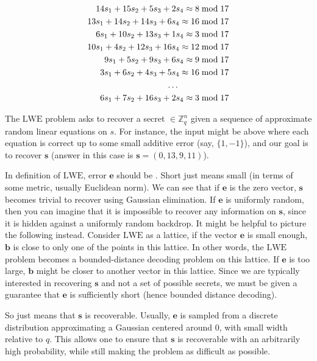 \begin{equation}
\centering
\begin{split}
14s_1 + 15s_2 + 5s_3 + 2s_4 \approx 8 \bmod 17\\
13s_1 + 14s_2 + 14s_3 + 6s_4 \approx 16 \bmod 17\\
6s_1 + 10s_2 + 13s_3 + 1s_4 \approx 3 \bmod 17\\
10s_1 + 4s_2 + 12s_3 + 16s_4 \approx 12 \bmod 17\\
9s_1 + 5s_2 + 9s_3 + 6s_4 \approx 9 \bmod 17\\
3s_1 + 6s_2 + 4s_3 + 5s_4 \approx 16 \bmod 17\\
\dots\quad\quad\quad\quad\quad\quad\\
6s_1 + 7s_2 + 16s_3 + 2s_4 \approx 3 \bmod 17
\end{split}
\end{equation}


The $\mathrm{LWE}$ problem asks to recover a secret $ \in \mathbb{Z}^{n}_{q}$ given a sequence of approximate random linear equations on $s$. For instance, the input might be above where each equation is correct up to some small additive error (say, $\{1,-1\}$), and our goal is to recover $\textbf{s}$ (answer in this case is $\textbf{s} = (0, 13, 9, 11)$).


In definition of $\mathrm{LWE}$, error $\textbf{e}$ should be . Short just means small (in terms of some metric, usually Euclidean norm). We can see that if $\textbf{e}$ is the zero vector, $\textbf{s}$ becomes trivial to recover using Gaussian elimination. If $\textbf{e}$ is uniformly random, then you can imagine that it is impossible to recover any information on $\textbf{s}$, since it is hidden against a uniformly random backdrop. It might be helpful to picture the following instead. Consider $\mathrm{LWE}$ as a lattice, if the vector $\textbf{e}$ is small enough, $\textbf{b}$ is close to only one of the points in this lattice. In other words, the $\mathrm{LWE}$ problem becomes a bounded-distance decoding problem on this lattice. If $\textbf{e}$ is too large, $\textbf{b}$ might be closer to another vector in this lattice. Since we are typically interested in recovering $\textbf{s}$ and not a set of possible secrets, we must be given a guarantee that $\textbf{e}$ is sufficiently short (hence bounded distance decoding).

So  just means that $\textbf{s}$ is recoverable. Usually, $\textbf{e}$ is sampled from a discrete distribution approximating a Gaussian centered around $0$, with small width relative to $q$. This allows one to ensure that $\textbf{s}$ is recoverable with an arbitrarily high probability, while still making the problem as difficult as possible.




